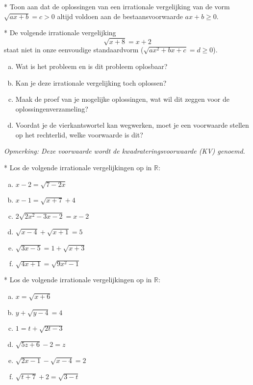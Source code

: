 \documentclass[12pt,twoside]{article}
\begin{document}
\begin{oefening}* Toon aan dat de oplossingen van een irrationale vergelijking van de vorm $\sqrt{ax+b}=c>0$ altijd voldoen aan de bestaansvoorwaarde $ax+b\geq0$.
\end{oefening}


\begin{oefening}*
De volgende irrationale vergelijking
$$\sqrt{x+8}=x+2$$
staat niet in onze eenvoudige standaardvorm ($\sqrt{ax^2+bx+c}=d\geq0$).
\begin{enumerate}[(a)]
  \item Wat is het probleem en is dit probleem oplosbaar?
  \item Kan je deze irrationale vergelijking toch oplossen?
  \item Maak de proef van je mogelijke oplossingen, wat wil dit zeggen voor de oplossingenverzameling?
  \item Voordat je de vierkantswortel kan wegwerken, moet je een voorwaarde stellen op het rechterlid, welke voorwaarde is dit?
\end{enumerate}
{\em Opmerking: Deze voorwaarde wordt de kwadrateringsvoorwaarde (KV) genoemd.}
\end{oefening}

\begin{oefening}*
Los de volgende irrationale vergelijkingen op in $\mathbb{R}$:
\begin{multicols}{2}
\begin{enumerate}[(a)]
  \item $x-2=\sqrt{7-2x}$
  \item $x-1=\sqrt{x+7}+4$
  \item $2\sqrt{2x^2-3x-2}=x-2$
  \item $\sqrt{x-4}+\sqrt{x+1}=5$
  \item $\sqrt{3x-5}=1+\sqrt{x+3}$
  \item $\sqrt{4x+1}=\sqrt{9x^2-1}$
\end{enumerate}
\end{multicols}
\end{oefening}

\begin{oefening}* %
Los de volgende irrationale vergelijkingen op in $\mathbb{R}$:
\begin{multicols}{2}
\begin{enumerate}[(a)]
  \item $x=\sqrt{x+6}$
  \item $y+\sqrt{y-4}=4$
  \item $1=t+\sqrt{2t-3}$
  \item $\sqrt{5z+6}-2=z$
  \item $\sqrt{2x-1}-\sqrt{x-4}=2$
  \item $\sqrt{t+7}+2=\sqrt{3-t}$
\end{enumerate}
\end{multicols}
\end{oefening}
\end{document}
